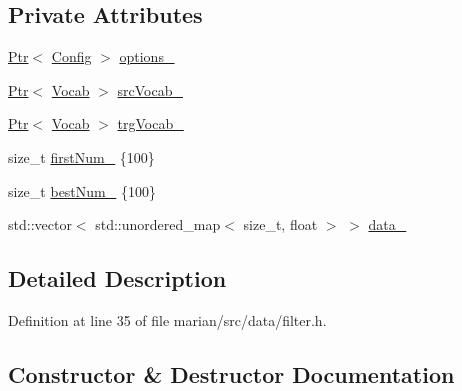 \subsection*{Private Attributes}
\begin{DoxyCompactItemize}
\item 
\hyperlink{namespacemarian_ad1a373be43a00ef9ce35666145137b08}{Ptr}$<$ \hyperlink{classmarian_1_1Config}{Config} $>$ \hyperlink{classmarian_1_1Filter_a4a7ec367d7b3ca5e95021a83181a7304}{options\+\_\+}
\item 
\hyperlink{namespacemarian_ad1a373be43a00ef9ce35666145137b08}{Ptr}$<$ \hyperlink{classmarian_1_1Vocab}{Vocab} $>$ \hyperlink{classmarian_1_1Filter_a87666bc7520862fc5adb6923c59a7a98}{src\+Vocab\+\_\+}
\item 
\hyperlink{namespacemarian_ad1a373be43a00ef9ce35666145137b08}{Ptr}$<$ \hyperlink{classmarian_1_1Vocab}{Vocab} $>$ \hyperlink{classmarian_1_1Filter_a2003fa017c08e47172cf1f102ec0e9be}{trg\+Vocab\+\_\+}
\item 
size\+\_\+t \hyperlink{classmarian_1_1Filter_ae7cffff59aba67252377a48d9f3b4bc4}{first\+Num\+\_\+} \{100\}
\item 
size\+\_\+t \hyperlink{classmarian_1_1Filter_a31bcefb59cbae4752b1e50b682631945}{best\+Num\+\_\+} \{100\}
\item 
std\+::vector$<$ std\+::unordered\+\_\+map$<$ size\+\_\+t, float $>$ $>$ \hyperlink{classmarian_1_1Filter_aad459e8cec49017a0d60e158bdd4b8e6}{data\+\_\+}
\end{DoxyCompactItemize}


\subsection{Detailed Description}


Definition at line 35 of file marian/src/data/filter.\+h.



\subsection{Constructor \& Destructor Documentation}
